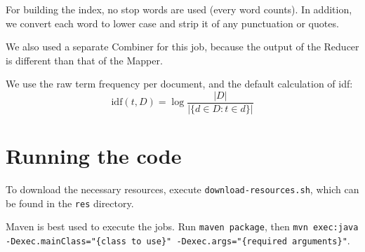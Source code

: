 \documentclass{article}
\begin{document}
For building the index, no stop words are used (every word counts). In addition, we convert each word to lower case
and strip it of any punctuation or quotes.

We also used a separate Combiner for this job, because the output of the Reducer is different than that of the Mapper.

We use the raw term frequency per document, and the default calculation of idf:
$$ \mathrm{idf}(t, D) = \log \frac{|D|}{|\{d \in D: t \in d\}|} $$

\section{Running the code}
To download the necessary resources, execute \texttt{download-resources.sh}, which can be
found in the \texttt{res} directory.

Maven is best used to execute the jobs. Run \texttt{maven package},
then \texttt{mvn exec:java -Dexec.mainClass="\{class to use\}" -Dexec.args="\{required arguments\}"}.
\end{document}
